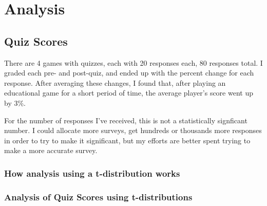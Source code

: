 \chapter{Analysis}



	\section{Quiz Scores}
		There are 4 games with quizzes, each with 20 responses each, 80 responses total. I graded each pre- and post-quiz, and ended up with the percent change for each response. After averaging these changes, I found that, after playing an educational game for a short period of time, the average player's score went up by 3\%.

		For the number of responses I've received, this is not a statistically signficant number. I could allocate more surveys, get hundreds or thousands more responses in order to try to make it significant, but my efforts are better spent trying to make a more accurate survey.

		\subsection{How analysis using a t-distribution works}

		\subsection{Analysis of Quiz Scores using t-distributions}


